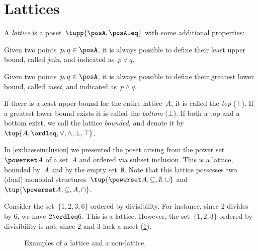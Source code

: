 

\section{Lattices}

\begin{definition}[Lattice]
  \label{def:lattice}
  A \emph{lattice} is a poset~$\tupp{\posA,\posAleq}$ with some additional properties:
  \begin{compactenum}
    \item Given two points~$p, q \in \posA$, it is always possible to define their least upper bound, called \emph{join}, and indicated as~$p \vee q$.
    \item Given two points~$p, q \in \posA$, it is always possible to define their greatest lower bound, called \emph{meet}, and indicated as~$p \wedge q$.
  \end{compactenum}
\end{definition}


\begin{remark}
  \label{def:top}
  \label{def:bot}
  If there is a least upper bound for the entire lattice~$A$, it is called
  the \emph{top} ($\top$). If a greatest lower bound exists it is called the \emph{bottom} ($\bot$). If both a top and a bottom exist, we call the lattice \emph{bounded}, and denote it by~$\tup{A,\ordleq,\vee,\wedge,\bot,\top}$.
\end{remark}

\begin{example}
  In \cref{ex:hasseinclusion} we presented the poset arising from the power set~$\powerset A$ of a set~$A$ and ordered via subset inclusion. This is a lattice, bounded by~$A$ and by the empty set~$\emptyset$. Note that this lattice possesses two (dual) monoidal structures~$\tup{\powerset A,\subseteq,\emptyset,\cup}$ and~$\tup{\powerset A,\subseteq,A,\cap}$.
\end{example}

\begin{example}
  Consider the set~$\{1,2,3,6\}$ ordered by divisibility. For instance, since 2 divides by 6, we have $2\ordleq 6$. This is a lattice. However, the set~$\{1,2,3\}$ ordered by divisibility is not, since 2 and 3 lack a meet (\cref{fig:exlattice}).
  \begin{figure}[h!]
    \begin{center}
    \end{center}
    \caption{Examples of a lattice and a non-lattice. \label{fig:exlattice}}
  \end{figure}
\end{example}

